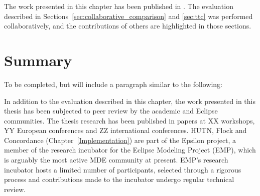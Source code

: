 The work presented in this chapter has been published in \cite{rose10comparison,rose10ttc_case,rose10ttc_solution}. The evaluation described in Sections~\ref{sec:collaborative_comparison} and \ref{sec:ttc} was performed collaboratively, and the contributions of others are highlighted in those sections.








\section{Summary}
To be completed, but will include a paragraph similar to the following:

In addition to the evaluation described in this chapter, the work presented in this thesis has been subjected to peer review by the academic and Eclipse communities. The thesis research has been published in papers at XX workshops, YY European conferences and ZZ international conferences. HUTN, Flock and Concordance (Chapter~\ref{Implementation}) are part of the Epsilon project, a member of the research incubator for the Eclipse Modeling Project (EMP), which is arguably the most active MDE community at present. EMP's research incubator hosts a limited number of participants, selected through a rigorous process and contributions made to the incubator undergo regular technical review.